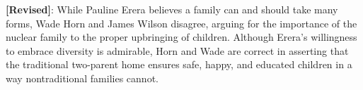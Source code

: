 \textbf{[Revised]}: While Pauline Erera believes a family can and should take many forms, Wade Horn and James Wilson disagree, arguing for the importance of the nuclear family to the proper upbringing of children. Although Erera's willingness to embrace diversity is admirable, Horn and Wade are correct in asserting that the traditional two-parent home ensures safe, happy, and educated children in a way nontraditional families cannot.


